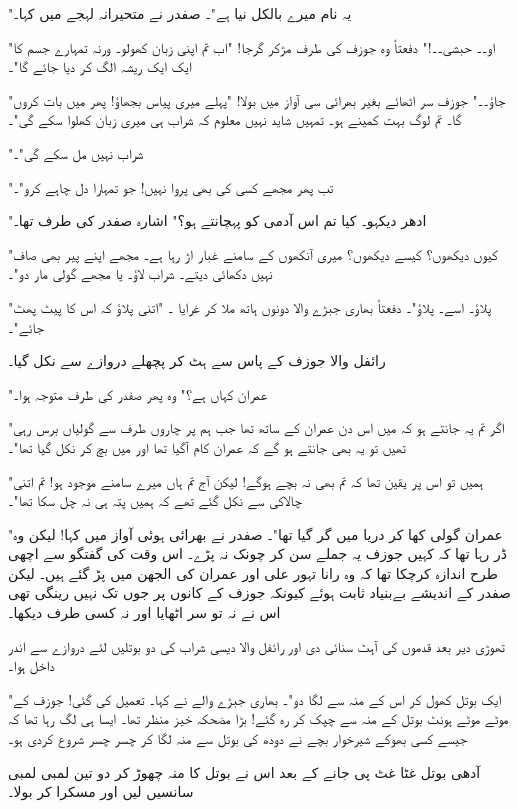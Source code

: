"یہ نام میرے بالکل نیا ہے"۔ صفدر نے متحیرانہ لہجے میں کہا۔

"او۔۔ حبشی۔۔!" دفعتاً وہ جوزف کی طرف مڑکر گرجا! "اب تم اپنی زبان کھولو۔ ورنہ تمہارے جسم کا ایک ایک ریشہ الگ کر دیا جائے گا"۔

"جاؤ۔۔" جوزف سر اٹھائے بغیر بھرائی سی آواز میں بولا! "پہلے میری پیاس بجھاؤ! پھر میں بات کروں گا۔ تم لوگ بہت کمینے ہو۔ تمہیں شاید نہیں معلوم کہ شراب ہی میری زبان کھلوا سکے گی"۔

"شراب نہیں مل سکے گی"۔

"تب پھر مجھے کسی کی بھی پروا نہیں! جو تمہارا دل چاہے کرو"۔

"ادھر دیکہو۔ کیا تم اس آدمی کو پہچانتے ہو؟" اشارہ صفدر کی طرف تھا۔

"کیوں دیکھوں؟ کیسے دیکھوں؟ میری آنکھوں کے سامنے غبار اڑ رہا ہے۔ مجھے اپنے پیر بھی صاف نہیں دکھائی دیتے۔ شراب لاؤ۔ یا مجھے گولی مار دو"۔

"پلاؤ۔ اسے۔ پلاؤ"۔ دفعتاً بھاری جبڑے والا دونوں ہاتھ ملا کر غرایا ۔ "اتنی پلاؤ کہ اس کا پیٹ پھٹ جائے"۔

رائفل والا جوزف کے پاس سے ہٹ کر پچھلے دروازے سے نکل گیا۔

"عمران کہاں ہے؟" وہ پھر صفدر کی طرف متوجہ ہوا۔

"اگر تم یہ جانتے ہو کہ میں اس دن عمران کے ساتھ تھا جب ہم پر چاروں طرف سے گولیاں برس رہی تھیں تو یہ بھی جانتے ہو گے کہ عمران کام آگیا تھا اور میں بچ کر نکل گیا تھا"۔

"ہمیں تو اس پر یقین تھا کہ تم بھی نہ بچے ہوگے! لیکن آج تم ہاں میرے سامنے موجود ہو! تم اتنی چالاکی سے نکل گئے تھے کہ ہمیں پتہ ہی نہ چل سکا تھا"۔

"عمران گولی کھا کر دریا میں گر گیا تھا"۔ صفدر نے بھرائی ہوئی آواز میں کہا! لیکن وہ ڈر رہا تھا کہ کہیں جوزف یہ جملے سن کر چونک نہ پڑے۔ اس وقت کی گفتگو سے اچھی طرح اندازہ کرچکا تھا کہ وہ رانا تہور علی اور عمران کی الجھن میں پڑ گئے ہیں۔
لیکن صفدر کے اندیشے بےبنیاد ثابت ہوئے کیونکہ جوزف کے کانوں پر جوں تک نہیں رینگی تھی اس نے نہ تو سر اٹھایا اور نہ کسی طرف دیکھا۔

تھوڑی دیر بعد قدموں کی آہٹ سنائی دی اور رائفل والا دیسی شراب کی دو بوتلیں لئے دروازے سے اندر داخل ہوا۔

"ایک بوتل کھول کر اس کے منہ سے لگا دو"۔ بھاری جبڑے والے نے کہا۔ تعمیل کی گئی! جوزف کے موٹے موٹے ہونٹ بوتل کے منہ سے چپک کر رہ گئے! بڑا مضحکہ خیز منظر تھا۔ ایسا ہی لگ رہا تھا کہ جیسے کسی بھوکے شیرخوار بچے نے دودھ کی بوتل سے منہ لگا کر چسر چسر شروع کردی ہو۔

آدھی بوتل غٹا غٹ پی جانے کے بعد اس نے بوتل کا منہ چھوڑ کر دو تین لمبی لمبی سانسیں لیں اور مسکرا کر بولا۔

